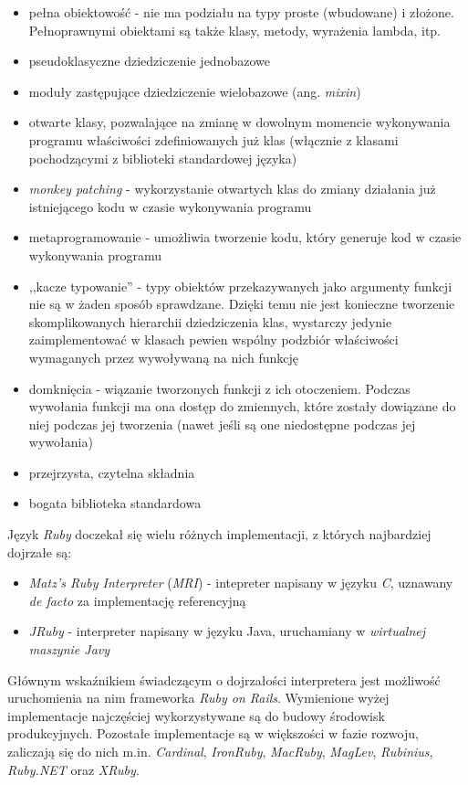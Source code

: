 \documentclass[11pt,twoside]{report}
\begin{document}
\begin{itemize}
\item pełna obiektowość - nie ma podziału na typy proste (wbudowane) i
  złożone. Pełnoprawnymi obiektami są także klasy, metody, wyrażenia
  lambda, itp.
\item pseudoklasyczne dziedziczenie jednobazowe
\item moduły zastępujące dziedziczenie wielobazowe (ang. \emph{mixin})
\item otwarte klasy, pozwalające na zmianę w dowolnym momencie
  wykonywania programu właściwości zdefiniowanych już klas (włącznie z
  klasami pochodzącymi z biblioteki standardowej języka)
\item \emph{monkey patching} - wykorzystanie otwartych klas do zmiany
  działania już istniejącego kodu w czasie wykonywania programu
\item metaprogramowanie - umożliwia tworzenie kodu, który generuje kod
  w czasie wykonywania programu
\item ,,kacze typowanie'' - typy obiektów przekazywanych jako
  argumenty funkcji nie są w żaden sposób sprawdzane. Dzięki temu nie
  jest konieczne tworzenie skomplikowanych hierarchii dziedziczenia
  klas, wystarczy jedynie zaimplementować w klasach pewien wspólny
  podzbiór właściwości wymaganych przez wywoływaną na nich funkcję
\item domknięcia - wiązanie tworzonych funkcji z ich
  otoczeniem. Podczas wywołania funkcji ma ona dostęp do zmiennych,
  które zostały dowiązane do niej podczas jej tworzenia (nawet jeśli
  są one niedostępne podczas jej wywołania)
\item przejrzysta, czytelna składnia
\item bogata biblioteka standardowa
\end{itemize}

Język \emph{Ruby} doczekał się wielu różnych implementacji, z których
najbardziej dojrzałe są:

\begin{itemize}
\item \emph{Matz's Ruby Interpreter} (\emph{MRI}) - intepreter
  napisany w języku \emph{C}, uznawany \emph{de facto} za
  implementację referencyjną
\item \emph{JRuby} - interpreter napisany w języku Java, uruchamiany w
  \emph{wirtualnej maszynie Javy}
\end{itemize}

Głównym wskaźnikiem świadczącym o dojrzałości interpretera jest
możliwość uruchomienia na nim frameworka \emph{Ruby on
  Rails}. Wymienione wyżej implementacje najczęściej wykorzystywane są
do budowy środowisk produkcyjnych. Pozostałe implementacje są w
większości w fazie rozwoju, zaliczają się do nich
m.in. \emph{Cardinal}, \emph{IronRuby}, \emph{MacRuby}, \emph{MagLev},
\emph{Rubinius}, \emph{Ruby.NET} oraz \emph{XRuby}.
\end{document}
